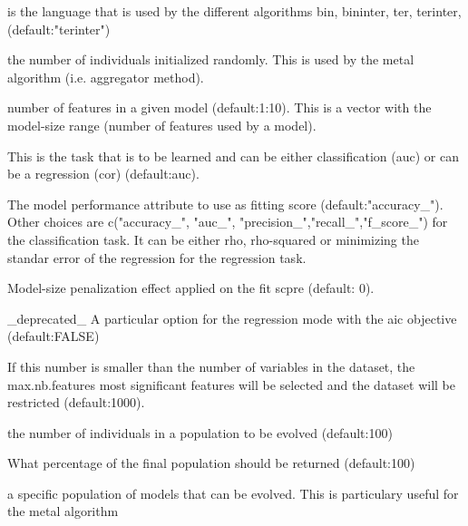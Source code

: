 \documentclass[a4paper]{book}
\begin{document}
\begin{Arguments}
\begin{ldescription}
\item[\code{language}] is the language that is used by the different algorithms 
bin, bininter, ter, terinter, (default:"terinter")

\item[\code{size\_pop\_random}] the number of individuals initialized randomly. This is used 
by the metal algorithm (i.e. aggregator method).

\item[\code{sparsity:}] number of features in a given model (default:1:10). 
This is a vector with the model-size range (number of features used by a model).

\item[\code{objective:}] This is the task that is to be learned and can be either classification 
(auc) or can be a regression (cor) (default:auc).

\item[\code{evalToFit:}] The model performance attribute to use as fitting score (default:"accuracy\_"). 
Other choices are c("accuracy\_", "auc\_", "precision\_","recall\_","f\_score\_") for the 
classification task. It can be either rho, rho-squared or minimizing the 
standar error of the regression for the regression task.

\item[\code{k\_penalty:}] Model-size penalization effect applied on the fit scpre (default: 0).

\item[\code{estimate\_coefs:}] \_deprecated\_ A particular option for the regression mode
with the aic objective (default:FALSE)

\item[\code{max.nb.features:}] If this number is smaller than the number of variables in the
dataset, the max.nb.features most significant features will be selected and the 
dataset will be restricted (default:1000).

\item[\code{size\_pop:}] the number of individuals in a population to be evolved (default:100)

\item[\code{final.pop.perc:}] What percentage of the final population should be returned (default:100)

\item[\code{in\_pop:}] a specific population of models that can be evolved. This is particulary
useful for the metal algorithm


\end{ldescription}
\end{Arguments}
\end{document}

